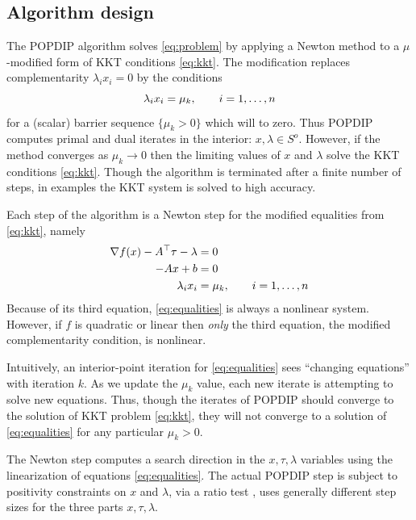 \documentclass[11pt]{article}
\newcommand{\grad}{\nabla}
\begin{document}
\subsection*{Algorithm design}

The POPDIP algorithm solves \eqref{eq:problem} by applying a Newton method to a $\mu$-modified form of KKT conditions \eqref{eq:kkt}.  The modification replaces complementarity $\lambda_i x_i = 0$ by the conditions
\begin{equation}
\lambda_i x_i = \mu_k, \qquad i=1,\dots,n \notag \\
\end{equation}
for a (scalar) barrier sequence $\{\mu_k>0\}$ which will to zero.  Thus POPDIP computes primal and dual iterates in the interior: $x,\lambda \in S^o$.  However, if the method converges as $\mu_k \to 0$ then the limiting values of $x$ and $\lambda$ solve the KKT conditions \eqref{eq:kkt}.  Though the algorithm is terminated after a finite number of steps, in examples the KKT system is solved to high accuracy.

Each step of the algorithm is a Newton step for the modified equalities from \eqref{eq:kkt}, namely
\begin{align}
\grad f(x) - A^\top \tau - \lambda &= 0 \label{eq:equalities} \\
-A x + b &= 0 \notag \\
\lambda_i x_i &= \mu_k, \qquad i=1,\dots,n \notag
\end{align}
Because of its third equation, \eqref{eq:equalities} is always a nonlinear system.  However, if $f$ is quadratic or linear then \emph{only} the third equation, the modified complementarity condition, is nonlinear.

Intuitively, an interior-point iteration for \eqref{eq:equalities} sees ``changing equations'' with iteration $k$.  As we update the $\mu_k$ value, each new iterate is attempting to solve new equations.  Thus, though the iterates of POPDIP should converge to the solution of KKT problem \eqref{eq:kkt}, they will not converge to a solution of \eqref{eq:equalities} for any particular $\mu_k>0$.

The Newton step computes a search direction in the $x,\tau,\lambda$ variables using the linearization of equations \eqref{eq:equalities}.  The actual POPDIP step is subject to positivity constraints on $x$ and $\lambda$, via a ratio test \cite[section 3.1]{GrivaNashSofer2009}, uses generally different step sizes for the three parts $x,\tau,\lambda$.
\end{document}
